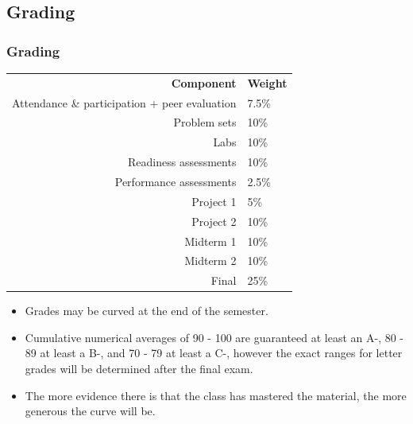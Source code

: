 \documentclass[11pt,containsverbatim,handout,xcolor=xelatex,dvipsnames,table]{beamer}
\begin{document}

\subsection{Grading}


\begin{frame}
\frametitle{Grading}

\begin{center}
\renewcommand\arraystretch{1.25}
{\scriptsize
\begin{tabular}{ r | l }
\textbf{Component} & \textbf{Weight} \\
Attendance \& participation + peer evaluation	& 7.5\% \\
Problem sets							& 10\%  \\ 
Labs									& 10\% \\    
Readiness assessments					& 10\%   \\  
Performance assessments 				& 2.5\%  \\  
Project 1								& 5\%   \\   
Project 2								& 10\% \\   
Midterm 1								& 10\% \\    
Midterm 2 							& 10\% \\    
Final 								& 25\%     
\end{tabular}
}
\end{center}

\begin{itemize}

\item Grades may be curved at the end of the semester. 

\item Cumulative numerical averages of 90 - 100 are guaranteed at least an A-, 
80 - 89 at least a B-, and 70 - 79 at least a C-, however the exact ranges for letter 
grades will be determined after the final exam.

\item The more evidence there is that the class has mastered the material, the more 
generous the curve will be.

\end{itemize}



\end{frame}

\end{document}
